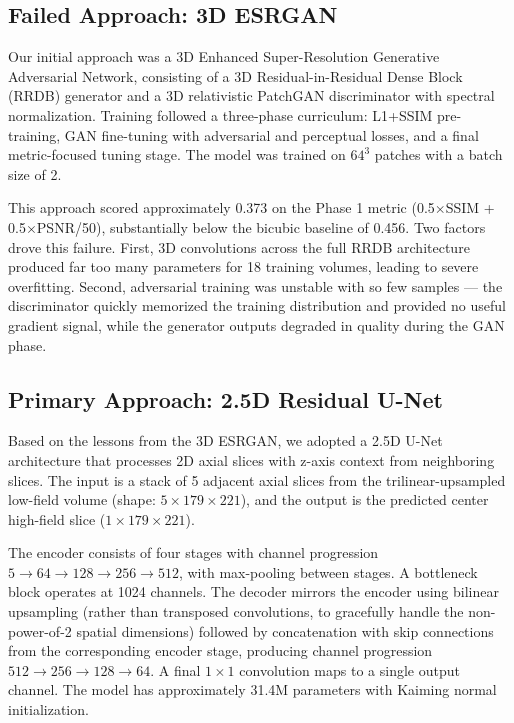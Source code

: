 \documentclass[a4paper,11pt]{article}
\begin{document}
\subsection{Failed Approach: 3D ESRGAN}
Our initial approach was a 3D Enhanced Super-Resolution Generative Adversarial Network, consisting of a 3D Residual-in-Residual Dense Block (RRDB) generator and a 3D relativistic PatchGAN discriminator with spectral normalization. Training followed a three-phase curriculum: L1+SSIM pre-training, GAN fine-tuning with adversarial and perceptual losses, and a final metric-focused tuning stage. The model was trained on $64^3$ patches with a batch size of 2.

This approach scored approximately 0.373 on the Phase 1 metric (0.5$\times$SSIM + 0.5$\times$PSNR/50), substantially below the bicubic baseline of 0.456. Two factors drove this failure. First, 3D convolutions across the full RRDB architecture produced far too many parameters for 18 training volumes, leading to severe overfitting. Second, adversarial training was unstable with so few samples --- the discriminator quickly memorized the training distribution and provided no useful gradient signal, while the generator outputs degraded in quality during the GAN phase.

\subsection{Primary Approach: 2.5D Residual U-Net}
Based on the lessons from the 3D ESRGAN, we adopted a 2.5D U-Net architecture \cite{ronneberger2015u} that processes 2D axial slices with z-axis context from neighboring slices. The input is a stack of 5 adjacent axial slices from the trilinear-upsampled low-field volume (shape: $5 \times 179 \times 221$), and the output is the predicted center high-field slice ($1 \times 179 \times 221$).

The encoder consists of four stages with channel progression $5 \rightarrow 64 \rightarrow 128 \rightarrow 256 \rightarrow 512$, with max-pooling between stages. A bottleneck block operates at 1024 channels. The decoder mirrors the encoder using bilinear upsampling (rather than transposed convolutions, to gracefully handle the non-power-of-2 spatial dimensions) followed by concatenation with skip connections from the corresponding encoder stage, producing channel progression $512 \rightarrow 256 \rightarrow 128 \rightarrow 64$. A final $1 \times 1$ convolution maps to a single output channel. The model has approximately 31.4M parameters with Kaiming normal initialization.
\end{document}
